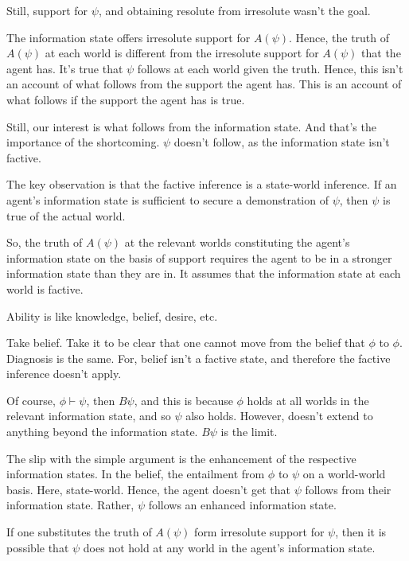 \documentclass[10pt]{article}
\begin{document}
\begin{note}
  Still, support for \(\psi\), and obtaining resolute from irresolute wasn't the goal.

  The information state offers irresolute support for \(A(\psi)\).
  Hence, the truth of \(A(\psi)\) at each world is different from the irresolute support for \(A(\psi)\) that the agent has.
  It's true that \(\psi\) follows at each world given the truth.
  Hence, this isn't an account of what follows from the support the agent has.
  This is an account of what follows if the support the agent has is true.

  Still, our interest is what follows from the information state.
  And that's the importance of the shortcoming.
  \(\psi\) doesn't follow, as the information state isn't factive.

  The key observation is that the factive inference is a state-world inference.
  If an agent's information state is sufficient to secure a demonstration of \(\psi\), then \(\psi\) is true of the actual world.

  So, the truth of \(A(\psi)\) at the relevant worlds constituting the agent's information state on the basis of support requires the agent to be in a stronger information state than they are in.
  It assumes that the information state at each world is factive.

  Ability is like knowledge, belief, desire, etc.

  Take belief.
  Take it to be clear that one cannot move from the belief that \(\phi\) to \(\phi\).
  Diagnosis is the same.
  For, belief isn't a factive state, and therefore the factive inference doesn't apply.

  Of course, \(\phi \vdash \psi\), then \(B\psi\), and this is because \(\phi\) holds at all worlds in the relevant information state, and so \(\psi\) also holds.
  However, doesn't extend to anything beyond the information state.
  \(B\psi\) is the limit.

  The slip with the simple argument is the enhancement of the respective information states.
  In the belief, the entailment from \(\phi\) to \(\psi\) on a world-world basis.
  Here, state-world.
  Hence, the agent doesn't get that \(\psi\) follows from their information state.
  Rather, \(\psi\) follows an enhanced information state.

  If one substitutes the truth of \(A(\psi)\) form irresolute support for \(\psi\), then it is possible that \(\psi\) does not hold at any world in the agent's information state.


\end{note}
\end{document}
